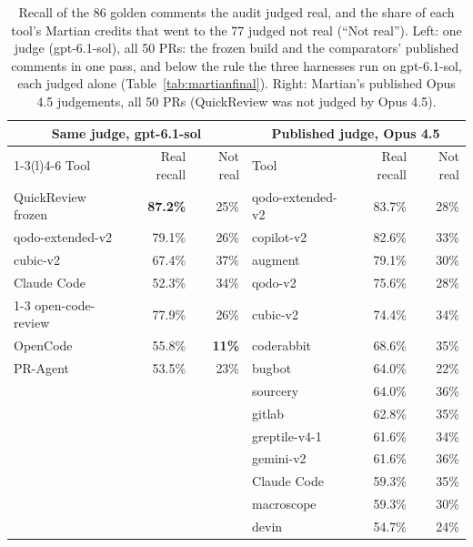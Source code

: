 \documentclass[11pt,a4paper]{article}
\newcommand{\qcr}{QuickReview}
\begin{document}
\begin{table}[tbp]
  \centering
  \caption{Recall of the 86 golden comments the audit judged real, and the
  share of each tool's Martian credits that went to the 77 judged not real
  (``Not real'').
  Left: one judge (gpt-6.1-sol), all 50 PRs: the frozen build and the
  comparators' published comments in one pass, and below the rule the three
  harnesses run on gpt-6.1-sol, each judged alone
  (Table~\ref{tab:martianfinal}).
  Right: Martian's published Opus 4.5 judgements, all 50 PRs (\qcr{} was
  not judged by Opus 4.5).}
  \label{tab:martianaudit}
  \small
  \begin{tabular}{lrr@{\hspace{1.5em}}lrr}
    \toprule
    \multicolumn{3}{c}{Same judge, gpt-6.1-sol} & \multicolumn{3}{c}{Published judge, Opus 4.5} \\
    \cmidrule(r){1-3}\cmidrule(l){4-6}
    Tool & Real recall & Not real & Tool & Real recall & Not real \\
    \midrule
    \qcr{} frozen & \textbf{87.2\%} & 25\% & qodo-extended-v2 & 83.7\% & 28\% \\
    qodo-extended-v2 & 79.1\% & 26\% & copilot-v2 & 82.6\% & 33\% \\
    cubic-v2 & 67.4\% & 37\% & augment & 79.1\% & 30\% \\
    Claude Code & 52.3\% & 34\% & qodo-v2 & 75.6\% & 28\% \\
    \cmidrule(r){1-3}
    open-code-review & 77.9\% & 26\% & cubic-v2 & 74.4\% & 34\% \\
    OpenCode & 55.8\% & \textbf{11\%} & coderabbit & 68.6\% & 35\% \\
    PR-Agent & 53.5\% & 23\% & bugbot & 64.0\% & 22\% \\
    & & & sourcery & 64.0\% & 36\% \\
    & & & gitlab & 62.8\% & 35\% \\
    & & & greptile-v4-1 & 61.6\% & 34\% \\
    & & & gemini-v2 & 61.6\% & 36\% \\
    & & & Claude Code & 59.3\% & 35\% \\
    & & & macroscope & 59.3\% & 30\% \\
    & & & devin & 54.7\% & 24\% \\
    \bottomrule
  \end{tabular}
\end{table}
\end{document}
